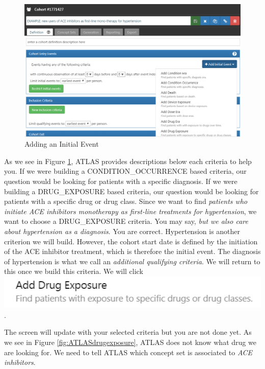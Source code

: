 \documentclass[11pt]{book}
\theoremstyle{definition}
\theoremstyle{definition}
\theoremstyle{definition}
\theoremstyle{remark}
\begin{document}
\begin{figure}

{\centering \includegraphics[width=0.9\linewidth]{images/Cohorts/ATLAS-initialevent} 

}

\caption{Adding an Initial Event}\label{fig:ATLASinitialevent}
\end{figure}

As we see in Figure \ref{fig:ATLASinitialevent}, ATLAS provides descriptions below each criteria to help you. If we were building a CONDITION\_OCCURRENCE based criteria, our question would be looking for patients with a specific diagnosis. If we were building a DRUG\_EXPOSURE based criteria, our question would be looking for patients with a specific drug or drug class. Since we want to find \emph{patients who initiate ACE inhibitors monotherapy as first-line treatments for hypertension}, we want to choose a DRUG\_EXPOSURE criteria. You may say, \emph{but we also care about hypertension as a diagnosis}. You are correct. Hypertension is another criterion we will build. However, the cohort start date is defined by the initiation of the ACE inhibitor treatment, which is therefore the initial event. The diagnosis of hypertension is what we call an \emph{additional qualifying criteria}. We will return to this once we build this criteria. We will click \includegraphics{images/Cohorts/drugexposure.png}.

The screen will update with your selected criteria but you are not done yet. As we see in Figure \ref{fig:ATLASdrugexposure}, ATLAS does not know what drug we are looking for. We need to tell ATLAS which concept set is associated to \emph{ACE inhibitors}.
\end{document}
